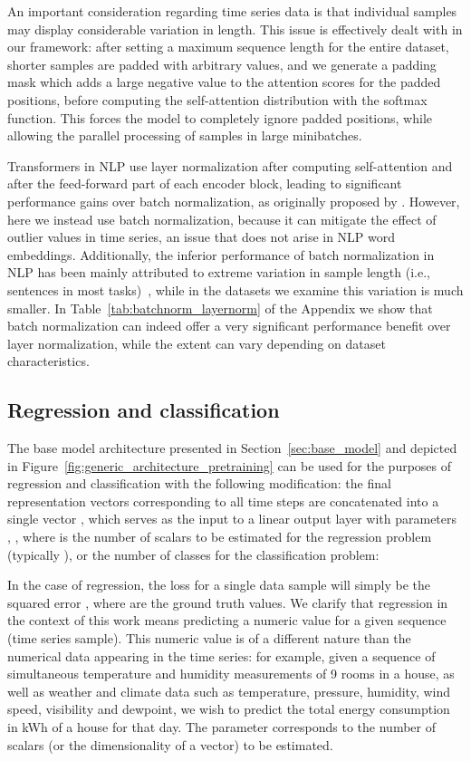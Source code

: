 \documentclass{article} \usepackage{iclr2021_conference,times}
\begin{document}
An important consideration regarding time series data is that individual samples may display considerable variation in length. This issue is effectively dealt with in our framework: after setting a maximum sequence length  for the entire dataset, shorter samples are padded with arbitrary values, and we generate a padding mask which adds a large negative value to the attention scores for the padded positions, before computing the self-attention distribution with the softmax function. This forces the model to completely ignore padded positions, while allowing the parallel processing of samples in large minibatches.

Transformers in NLP use layer normalization after computing self-attention and after the feed-forward part of each encoder block, leading to significant performance gains over batch normalization, as originally proposed by \cite{vaswani_attention_2017}. However, here we instead use batch normalization, because it can mitigate the effect of outlier values in time series, an issue that does not arise in NLP word embeddings. Additionally, the inferior performance of batch normalization in NLP has been mainly attributed to extreme variation in sample length (i.e., sentences in most tasks)~\citep{powernorm_2020}, while in the datasets we examine this variation is much smaller. In Table~\ref{tab:batchnorm_layernorm} of the Appendix we show that batch normalization can indeed offer a very significant performance benefit over layer normalization, while the extent can vary depending on dataset characteristics. 

\subsection{Regression and classification}

The base model architecture presented in Section~\ref{sec:base_model} and depicted in Figure~\ref{fig:generic_architecture_pretraining} can be used for the purposes of regression and classification with the following modification: the final representation vectors  corresponding to all time steps are concatenated into a single vector , which serves as the input to a linear output layer with parameters , , where  is the number of scalars to be estimated for the regression problem (typically ), or the number of classes for the classification problem:



In the case of regression, the loss for a single data sample will simply be the squared error , where  are the ground truth values. We clarify that regression in the context of this work means predicting a numeric value for a given sequence (time series sample). This numeric value is of a different nature than the numerical data appearing in the time series: for example, given a sequence of simultaneous temperature and humidity measurements of 9 rooms in a house, as well as weather and climate data such as temperature, pressure, humidity, wind speed, visibility and dewpoint, we wish to predict the total energy consumption in kWh of a house for that day. The parameter  corresponds to the number of scalars (or the dimensionality of a vector) to be estimated.
\end{document}
